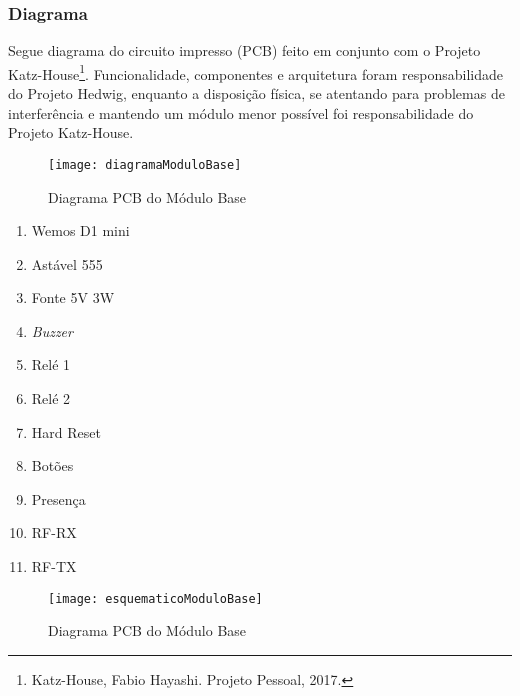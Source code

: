 \subsubsection{Diagrama}
Segue diagrama do circuito impresso (PCB) feito em conjunto com o Projeto Katz-House\footnote{Katz-House, Fabio Hayashi. Projeto Pessoal, 2017.}. Funcionalidade, componentes e arquitetura foram responsabilidade do Projeto Hedwig, enquanto a disposição física, se atentando para problemas de interferência e mantendo um módulo menor possível foi responsabilidade do Projeto Katz-House.

\begin{figure}[H]
	\centering
	\caption{Diagrama PCB do Módulo Base}
  \texttt{[image: diagramaModuloBase]}
\label{fig:diagramaModuloBase}
\end{figure}

\begin{enumerate}
\item Wemos D1 mini
\item Astável 555
\item Fonte 5V 3W
\item \textit{Buzzer}
\item Relé 1
\item Relé 2
\item Hard Reset
\item Botões
\item Presença
\item RF-RX
\item RF-TX
\end{enumerate}

\begin{figure}[H]
	\centering
	\caption{Diagrama PCB do Módulo Base}
  \texttt{[image: esquematicoModuloBase]}
\label{fig:esquematicoModuloBase}
\end{figure}

